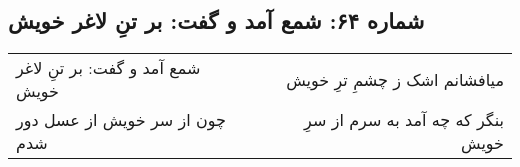 \begin{center}
\section*{شماره ۶۴: شمع آمد و گفت: بر تنِ لاغر خویش}
\label{sec:064}
\begin{longtable}{l p{0.5cm} r}
شمع آمد و گفت: بر تنِ لاغر خویش
&&
میافشانم اشک ز چشمِ ترِ خویش
\\
چون از سر خویش از عسل دور شدم
&&
بنگر که چه آمد به سرم از سرِ خویش
\\
\end{longtable}
\end{center}
